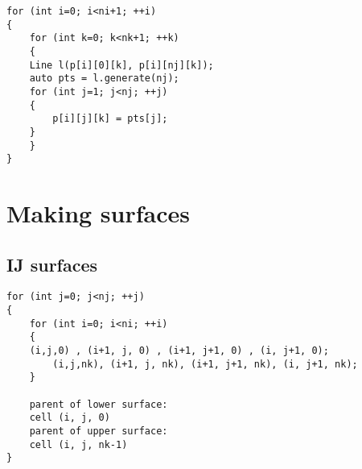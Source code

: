 \documentclass{article}
\begin{document}
\begin{lstlisting}
for (int i=0; i<ni+1; ++i)
{
    for (int k=0; k<nk+1; ++k)
    {
	Line l(p[i][0][k], p[i][nj][k]);
	auto pts = l.generate(nj);
	for (int j=1; j<nj; ++j)
	{
	    p[i][j][k] = pts[j];
	}
    }
}
\end{lstlisting}



\section{Making surfaces}

\subsection{IJ surfaces}

\begin{lstlisting}
for (int j=0; j<nj; ++j)
{
    for (int i=0; i<ni; ++i)
    {
	(i,j,0) , (i+1, j, 0) , (i+1, j+1, 0) , (i, j+1, 0);
        (i,j,nk), (i+1, j, nk), (i+1, j+1, nk), (i, j+1, nk);
    }

    parent of lower surface: 
	cell (i, j, 0)
    parent of upper surface: 
	cell (i, j, nk-1)
}
\end{lstlisting}
\end{document}
